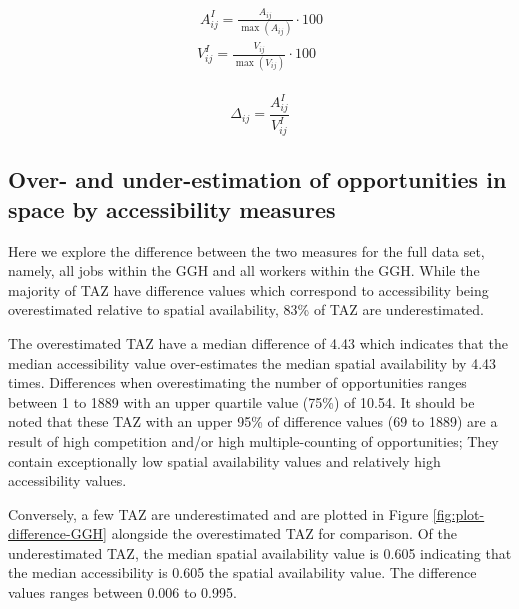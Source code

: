\documentclass[]{elsarticle} %
\begin{document}
\begin{equation}
\label{eq:index-measures}
\begin{array}{l}\
A^I_{ij} = \frac{A_{ij}}{\max(A_{ij})}\cdot100\\
V^I_{ij} = \frac{V_{ij}}{\max(V_{ij})}\cdot100\\
\end{array}
\end{equation}

\begin{equation}
\label{eq:dif-index-measures}
\Delta_{ij} = \frac{A^I_{ij}}{V^I_{ij}}
\end{equation}

\hypertarget{over--and-under-estimation-of-opportunities-in-space-by-accessibility-measures}{%
\subsection{Over- and under-estimation of opportunities in space by
accessibility
measures}\label{over--and-under-estimation-of-opportunities-in-space-by-accessibility-measures}}

Here we explore the difference between the two measures for the full
data set, namely, all jobs within the GGH and all workers within the
GGH. While the majority of TAZ have difference values which correspond
to accessibility being overestimated relative to spatial availability,
83\% of TAZ are underestimated.

The overestimated TAZ have a median difference of 4.43 which indicates
that the median accessibility value over-estimates the median spatial
availability by 4.43 times. Differences when overestimating the number
of opportunities ranges between 1 to 1889 with an upper quartile value
(75\%) of 10.54. It should be noted that these TAZ with an upper 95\% of
difference values (69 to 1889) are a result of high competition and/or
high multiple-counting of opportunities; They contain exceptionally low
spatial availability values and relatively high accessibility values.

Conversely, a few TAZ are underestimated and are plotted in Figure
\ref{fig:plot-difference-GGH} alongside the overestimated TAZ for
comparison. Of the underestimated TAZ, the median spatial availability
value is 0.605 indicating that the median accessibility is 0.605 the
spatial availability value. The difference values ranges between 0.006
to 0.995.
\end{document}
